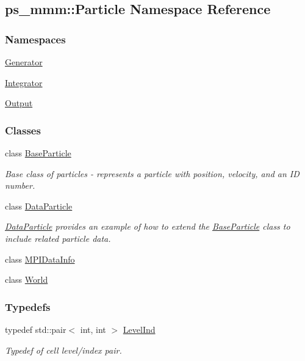 \hypertarget{namespaceps__mmm_1_1_particle}{}\subsection{ps\+\_\+mmm\+:\+:Particle Namespace Reference}
\label{namespaceps__mmm_1_1_particle}
\subsubsection*{Namespaces}
\begin{DoxyCompactItemize}
\item 
 \hyperlink{namespaceps__mmm_1_1_particle_1_1_generator}{Generator}
\item 
 \hyperlink{namespaceps__mmm_1_1_particle_1_1_integrator}{Integrator}
\item 
 \hyperlink{namespaceps__mmm_1_1_particle_1_1_output}{Output}
\end{DoxyCompactItemize}
\subsubsection*{Classes}
\begin{DoxyCompactItemize}
\item 
class \hyperlink{classps__mmm_1_1_particle_1_1_base_particle}{Base\+Particle}
\begin{DoxyCompactList}\small\item\em Base class of particles -\/ represents a particle with position, velocity, and an I\+D number. \end{DoxyCompactList}\item 
class \hyperlink{classps__mmm_1_1_particle_1_1_data_particle}{Data\+Particle}
\begin{DoxyCompactList}\small\item\em \hyperlink{classps__mmm_1_1_particle_1_1_data_particle}{Data\+Particle} provides an example of how to extend the \hyperlink{classps__mmm_1_1_particle_1_1_base_particle}{Base\+Particle} class to include related particle data. \end{DoxyCompactList}\item 
class \hyperlink{classps__mmm_1_1_particle_1_1_m_p_i_data_info}{M\+P\+I\+Data\+Info}
\item 
class \hyperlink{classps__mmm_1_1_particle_1_1_world}{World}
\end{DoxyCompactItemize}
\subsubsection*{Typedefs}
\begin{DoxyCompactItemize}
\item 
typedef std\+::pair$<$ int, int $>$ \hyperlink{namespaceps__mmm_1_1_particle_a475174140997ceb63cc9e801b6c0c4b8}{Level\+Ind}
\begin{DoxyCompactList}\small\item\em Typedef of cell level/index pair. \end{DoxyCompactList}\end{DoxyCompactItemize}

